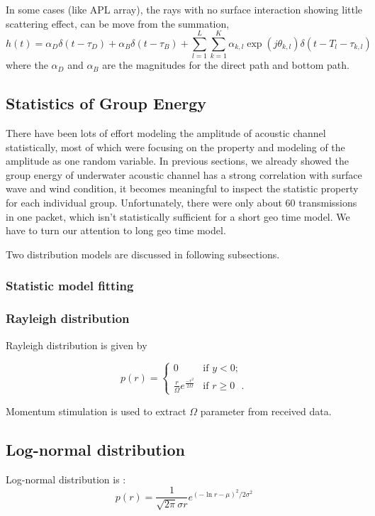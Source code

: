In some cases (like APL array), the rays with no surface interaction
showing little scattering effect, can be move from the summation,
\begin{equation}
h(t)=\alpha_D\delta(t-\tau_D)+\alpha_B\delta(t-\tau_B)+\sum_{l=1}^{L}\sum_{k=1}^{K}\alpha_{k,l}\exp(j\theta_{k,l})\delta(t-T_l-\tau_{k,l})
\end{equation}
where the $\alpha_D$ and $\alpha_B$ are the magnitudes for the
direct path and bottom path.


\subsection{Statistics of Group Energy}
 There have been lots of effort modeling the
amplitude of acoustic channel statistically, most of which were
focusing on the property and modeling of the amplitude as one random
variable. In previous sections, we already showed the group energy
of underwater acoustic channel has a strong correlation with surface
wave and wind condition, it becomes meaningful to inspect the
statistic property for each individual group. Unfortunately, there
were only about 60 transmissions in one packet, which isn't
statistically sufficient for a short geo time model. We have to turn
our attention to long geo time model.

Two distribution models are discussed in following subsections.
\subsubsection{Statistic model fitting}
\subsubsection*{ Rayleigh distribution}

Rayleigh distribution is given by

\begin{equation}
p(r)=\left\{ \begin{array}{ll}
         0 & \mbox{if $y < 0$};\\
        \frac{r}{\Omega}e^{\frac{-r^2}{2\Omega}} & \mbox{if $r \geq0$ }.\end{array}
        \right.
\end{equation}

Momentum stimulation is used to extract $\Omega$ parameter from
received data.
\subsection*{Log-normal distribution}
Log-normal distribution is :
\begin{equation}
p(r)=\frac{1}{\sqrt{2\pi}\sigma r}e^{(-\ln r
-\mu)^2/2\sigma^2}\end{equation}

